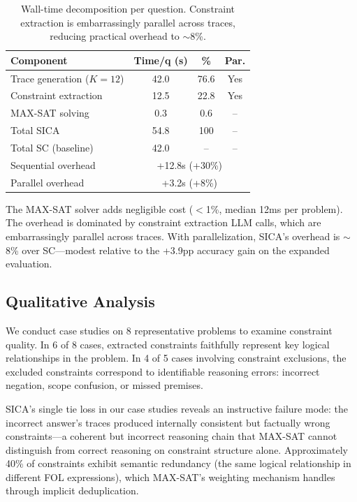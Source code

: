\documentclass[11pt,a4paper]{article}
\begin{document}
\begin{table}[t]
\centering
\small
\begin{tabular}{lccc}
\toprule
\textbf{Component} & \textbf{Time/q (s)} & \textbf{\%} & \textbf{Par.} \\
\midrule
Trace generation ($K\!=\!12$) & 42.0 & 76.6 & Yes \\
Constraint extraction & 12.5 & 22.8 & Yes \\
MAX-SAT solving & 0.3 & 0.6 & -- \\
\midrule
Total SICA & 54.8 & 100 & -- \\
Total SC (baseline) & 42.0 & -- & -- \\
\midrule
Sequential overhead & \multicolumn{3}{c}{+12.8s (+30\%)} \\
Parallel overhead & \multicolumn{3}{c}{+3.2s (+8\%)} \\
\bottomrule
\end{tabular}
\caption{Wall-time decomposition per question. Constraint extraction is embarrassingly parallel across traces, reducing practical overhead to $\sim$8\%.}
\label{tab:overhead}
\end{table}

The MAX-SAT solver adds negligible cost ($<$1\%, median 12ms per problem). The overhead is dominated by constraint extraction LLM calls, which are embarrassingly parallel across traces. With parallelization, SICA's overhead is $\sim$8\% over SC---modest relative to the +3.9pp accuracy gain on the expanded evaluation.

\subsection{Qualitative Analysis}
\label{sec:qualitative}

We conduct case studies on 8 representative problems to examine constraint quality. In 6 of 8 cases, extracted constraints faithfully represent key logical relationships in the problem. In 4 of 5 cases involving constraint exclusions, the excluded constraints correspond to identifiable reasoning errors: incorrect negation, scope confusion, or missed premises.

SICA's single tie loss in our case studies reveals an instructive failure mode: the incorrect answer's traces produced internally consistent but factually wrong constraints---a coherent but incorrect reasoning chain that MAX-SAT cannot distinguish from correct reasoning on constraint structure alone. Approximately 40\% of constraints exhibit semantic redundancy (the same logical relationship in different FOL expressions), which MAX-SAT's weighting mechanism handles through implicit deduplication.
\end{document}

